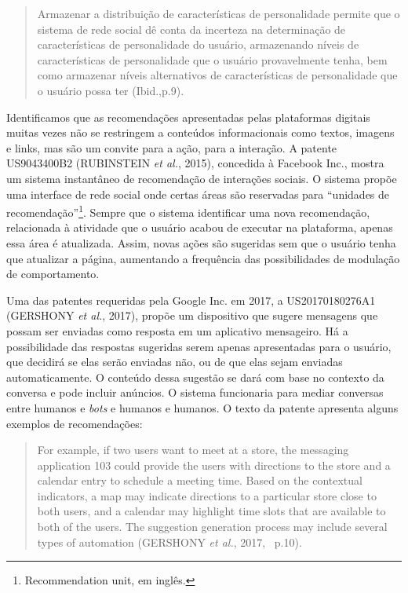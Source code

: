 \begin{quote}
Armazenar a distribuição de características de personalidade permite que
o sistema de rede social dê conta da incerteza na determinação de
características de personalidade do usuário, armazenando níveis de
características de personalidade que o usuário provavelmente tenha, bem
como armazenar níveis alternativos de características de personalidade
que o usuário possa ter (Ibid.,p.9).
\end{quote}

Identificamos que as recomendações apresentadas pelas plataformas
digitais muitas vezes não se restringem a conteúdos informacionais como
textos, imagens e links, mas são um convite para a ação, para a
interação. A patente US9043400B2 (RUBINSTEIN \emph{et al.}, 2015),
concedida à Facebook Inc., mostra um sistema instantâneo de recomendação
de interações sociais. O sistema propõe uma interface de rede social
onde certas áreas são reservadas para ``unidades de
recomendação''\footnote{Recommendation unit, em inglês.}. Sempre que o
sistema identificar uma nova recomendação, relacionada à atividade que o
usuário acabou de executar na plataforma, apenas essa área é atualizada.
Assim, novas ações são sugeridas sem que o usuário tenha que atualizar a
página, aumentando a frequência das possibilidades de modulação de
comportamento.

Uma das patentes requeridas pela Google Inc. em 2017, a US20170180276A1
(GERSHONY \emph{et al.}, 2017), propõe um dispositivo que sugere
mensagens que possam ser enviadas como resposta em um aplicativo
mensageiro. Há a possibilidade das respostas sugeridas serem apenas
apresentadas para o usuário, que decidirá se elas serão enviadas não, ou
de que elas sejam enviadas automaticamente. O conteúdo dessa sugestão se
dará com base no contexto da conversa e pode incluir anúncios. O sistema
funcionaria para mediar conversas entre humanos e \emph{bots} e humanos
e humanos. O texto da patente apresenta alguns exemplos de
recomendações:

\begin{quote}
For example, if two users want to meet at a store, the messaging
application 103 could provide the users with directions to the store and
a calendar entry to schedule a meeting time. Based on the contextual
indicators, a map may indicate directions to a particular store close to
both users, and a calendar may highlight time slots that are available
to both of the users. The suggestion generation process may include
several types of automation (GERSHONY \emph{et al.}, 2017,~ p.10).
\end{quote}

